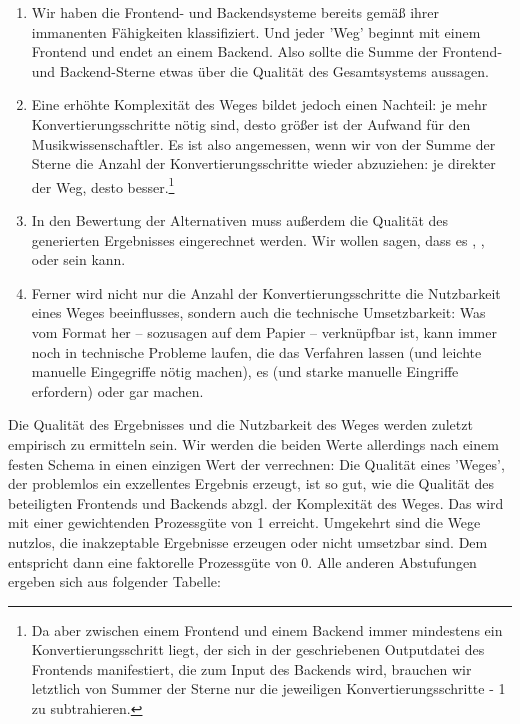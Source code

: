 \begin{enumerate}
  \item Wir haben die Frontend- und Backendsysteme bereits gemäß ihrer immanenten
  Fähigkeiten klassifiziert. Und jeder 'Weg' beginnt mit einem Frontend und endet
  an einem Backend. Also sollte die Summe der Frontend- und Backend-Sterne etwas
  über die Qualität des Gesamtsystems aussagen.
  \item Eine erhöhte Komplexität des Weges bildet jedoch einen Nachteil: je mehr
  Konvertierungsschritte nötig sind, desto größer ist der Aufwand für den
  Musikwissenschaftler. Es ist also angemessen, wenn wir von der Summe der
  Sterne die Anzahl der Konvertierungsschritte wieder abzuziehen: je direkter
  der Weg, desto besser.\footnote{Da aber zwischen einem Frontend und einem
  Backend immer mindestens ein Konvertierungsschritt liegt, der sich in der
  geschriebenen Outputdatei des Frontends manifestiert, die zum Input des
  Backends wird, brauchen wir letztlich von Summer der Sterne nur die jeweiligen
  Konvertierungsschritte - 1 zu subtrahieren.}
  \item In den Bewertung der Alternativen muss außerdem die Qualität des
  generierten Ergebnisses eingerechnet werden. Wir wollen sagen, dass es
  , ,  oder 
  sein kann.
  \item Ferner wird nicht nur die Anzahl der Konvertierungsschritte die
  Nutzbarkeit eines Weges beeinflusses, sondern auch die technische
  Umsetzbarkeit: Was vom Format her -- sozusagen auf dem Papier --
   verknüpfbar ist, kann immer noch in technische Probleme
  laufen, die das Verfahren  lassen (und leichte manuelle
  Eingegriffe nötig machen), es  (und starke manuelle Eingriffe
  erfordern) oder gar  machen.
\end{enumerate}
 
Die Qualität des Ergebnisses und die Nutzbarkeit des Weges werden zuletzt
empirisch zu ermitteln sein. Wir werden die beiden Werte allerdings nach einem
festen Schema in einen einzigen Wert der  verrechnen: Die Qualität
eines 'Weges', der problemlos ein exzellentes Ergebnis erzeugt, ist so gut, wie
die Qualität des beteiligten Frontends und Backends abzgl. der Komplexität des
Weges. Das wird mit einer gewichtenden Prozessgüte von 1 erreicht. Umgekehrt
sind die Wege nutzlos, die inakzeptable Ergebnisse erzeugen oder nicht umsetzbar
sind. Dem entspricht dann eine faktorelle Prozessgüte von 0. Alle anderen
Abstufungen ergeben sich aus folgender Tabelle:

